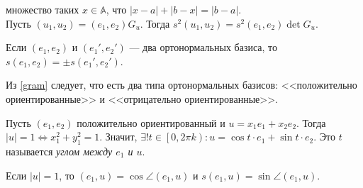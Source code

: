 \documentclass[12pt,a4paper]{article}
\begin{document}
 множество таких $x\in \mathbb A$, что $|x-a|+|b-x|=|b-a|$.\\

\lemma Пусть $(u_1,u_2)=(e_1,e_2)G_u$. Тогда $s^2(u_1,u_2)=s^2(e_1,e_2)\det G_u$.

\lemma Если $(e_1,e_2)$ и $(e_1',e_2')$ --- два ортонормальных базиса, то $s(e_1,e_2)=\pm s(e_1',e_2')$.\label{gram}

\newpage

Из \ref{gram} следует, что есть два типа ортонормальных базисов: <<положительно ориентированные>> и <<отрицательно ориентированные>>.

Пусть $(e_1,e_2)$ положительно ориентированный и $u=x_1e_1+x_2e_2$. Тогда $|u|=1\iff x_1^2+y_1^2=1$. Значит, $\exists! t\in\left[0,2\pi k\right):u=\cos t\cdot e_1+\sin t\cdot e_2$. Это $t$ называется \textit{углом между $e_1$ и $u$}.

\lemma Если $|u|=1$, то $(e_1,u)=\cos\angle(e_1,u)$ и $s(e_1,u)=\sin\angle(e_1,u)$.
\end{document}
